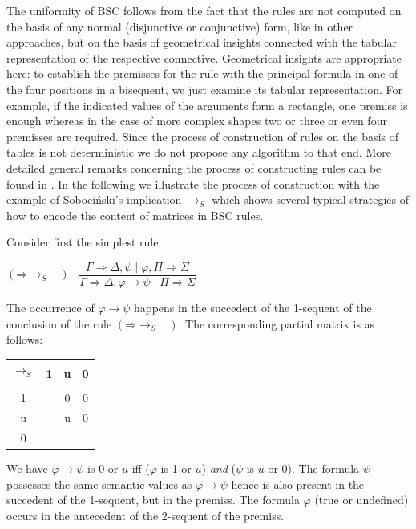 \documentclass[11pt,a4paper,titlepage]{article}
\theoremstyle{definition}
\newcommand{\3}{\vspace{.3in}}
\newcommand{\2}{\vspace{.2in}}
\newcommand{\1}{\vspace{.1in}}
\newcommand{\5}{\vspace{.05in}}
\begin{document}
The uniformity of BSC follows from the fact that the rules are
not computed on the basis of any normal (disjunctive or conjunctive) form,
like in other approaches, but on the basis of geometrical insights connected with the tabular representation of the
respective connective. Geometrical insights are appropriate here: to establish the
premisses for the rule with the principal formula in one of the four positions in
a bisequent, we just examine its tabular representation. For
example, if the indicated values of the arguments form a rectangle, one premiss is
enough whereas in the case of more complex shapes two or three or even four premisses are
required.
Since the process of construction of rules on the basis of tables is not deterministic
we do not propose any algorithm to that end. More detailed general remarks concerning the process of constructing rules can be found in \cite{Indrzejczak3}. In the following we illustrate 
the process of construction with the example of Soboci\'nski's implication $ \rightarrow_S $ which shows several typical strategies of how to encode the content of matrices in BSC rules.

Consider first the simplest rule:


\begin{flushleft}
	$(\mathord{\Rightarrow}\mathord{\rightarrow_S}\mid)$ \, $\dfrac{\Gamma
		\Rightarrow \Delta, \psi \mid \varphi, \Pi\Rightarrow\Sigma}{\Gamma\Rightarrow\Delta, \varphi\rightarrow\psi \mid \Pi\Rightarrow\Sigma}$
\end{flushleft} 

The occurrence of $\varphi\rightarrow\psi$ happens in the succedent of the 1-sequent of the conclusion of the rule $(\mathord{\Rightarrow}\mathord{\rightarrow_S}\mid)$.
The corresponding partial matrix is as follows:

\1

\begin{tabular}{|c|ccc|}
	\hline
	$\underline{\rightarrow_S} $ & 1 & u & 0 \\
	\hline
	1 &  & 0 & 0 \\
	u &  & u & 0 \\
	0 &  &  &  \\
	\hline
\end{tabular} 

\1

We have $\varphi\rightarrow\psi$ is 0 or $u$ iff ($\varphi$ is 1 or $u$) \textit{and} ($\psi$ is $u$ or 0).  The formula $ \psi $ possesses the same semantic values as $\varphi\rightarrow\psi$ hence is also present in the succedent of the 1-sequent, but in the premiss. The formula $ \varphi $ (true or undefined) occurs in the antecedent of the 2-sequent of the premiss.
\end{document}
